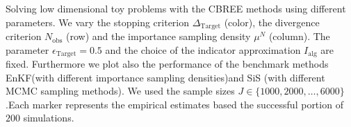 Solving low dimensional toy problems with the CBREE methods using  different parameters. We vary the stopping criterion $\Delta_{\text{Target}}$ (color), the divergence criterion $N_\text{obs}$ (row) and the importance sampling density $\mu^N$ (column). The parameter $\epsilon_{\text{Target}} = 0.5$ and the choice of the indicator approximation $I_\text{alg}$ are fixed. Furthermore we plot also the performance of the benchmark methods EnKF(with different importance sampling densities)and SiS (with different MCMC sampling methods). We used the sample sizes $J \in \{1000, 2000, \ldots, 6000\}$.Each marker represents the empirical estimates based the successful portion of $200$ simulations.